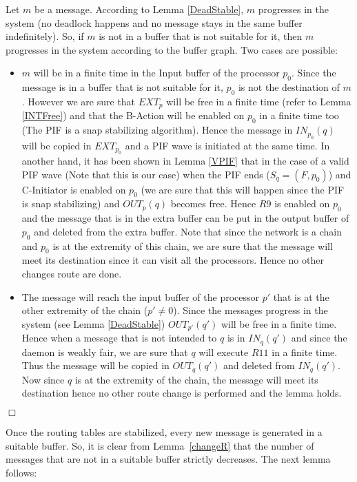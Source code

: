 \documentclass{llncs}
\renewenvironment{proof}{{\it Proof. } }{{\hfill $\Box$}\vspace{.5pc}}
\begin{document}
\begin{proof}
Let $m$ be a message. 
According to Lemma \ref{DeadStable}, $m$ progresses in the system (no deadlock happens and no message stays in the same buffer indefinitely). 
So, if $m$ is not in a buffer that is not suitable for it, then $m$ progresses in the system according to the buffer
graph.
Two cases are possible:
\begin{itemize}
\item{$m$ will be in a finite time in the Input buffer of the processor $p_{0}$. Since the message is in a buffer that is not suitable for it, $p_{0}$ is not the destination of $m$. However we are sure that $EXT_{p}$ will be free in a finite time (refer to Lemma \ref{INTFree}) and that the B-Action will be enabled on $p_{0}$ in a finite time too (The PIF is a snap stabilizing algorithm). Hence the message in $IN_{p_{0}}(q)$ will be copied in $EXT_{p_{0}}$ and a PIF wave is initiated at the same time. In another hand, it has been shown in Lemma \ref{VPIF} that in the case of a valid PIF wave (Note that this is our case)  when the PIF ends ($S_{q}=(F,p_{0})$) and C-Initiator is enabled on $p_{0}$ (we are sure that this will happen since the PIF is snap stabilizing) and $OUT_{p}(q)$ becomes free. Hence $R9$ is enabled on $p_{0}$ and the message that is in the extra buffer can be put in the output buffer of $p_{0}$ and deleted from the extra buffer. Note that since the network is a chain and $p_{0}$ is at the extremity of this chain, we are sure that the message will meet its destination since it can visit all the processors. Hence no other changes route are done.}
\item{The message will reach the input buffer of the processor $p'$ that is at the other extremity of the chain ($p'\ne 0$). Since the messages progress in the system (see Lemma \ref{DeadStable}) $OUT_{p'}(q')$ will be free in a finite time. Hence when a message that is not intended to $q$ is in $IN_{q}(q')$ and since the daemon is weakly fair, we are sure that $q$ will execute $R11$ in a finite time. Thus the message will be copied in $OUT_{q}(q')$ and deleted from $IN_{q}(q')$. Now since $q$ is at the extremity of the chain, the message will meet its destination hence no other route change is performed and the lemma holds.  }
\end{itemize}
\end{proof}

 Once the routing tables are stabilized, every new message is generated in a suitable buffer.  So, it is clear from Lemma~\ref{changeR} that the number of messages that are not
in a suitable buffer strictly decreases.  The next lemma follows:
\end{document}
